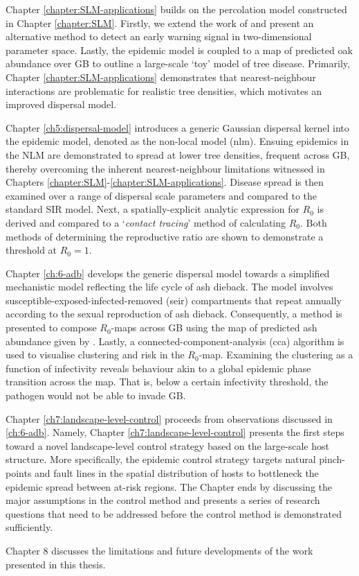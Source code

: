 Chapter \ref{chapter:SLM-applications} builds on the percolation model constructed in Chapter \ref{chapter:SLM}.
Firstly, we extend the work of \cite{OROZCOFUENTES201912} and present an alternative method to detect an early
warning signal in two-dimensional parameter space. Lastly, the epidemic model is coupled to a map of predicted
oak abundance over GB \cite{hill.data} to outline a large-scale `toy' model of tree disease. 
Primarily, Chapter \ref{chapter:SLM-applications} demonstrates that nearest-neighbour interactions are problematic
for realistic tree densities, which motivates an improved dispersal model. 

Chapter \ref{ch5:dispersal-model} introduces a generic Gaussian dispersal kernel into the epidemic model, denoted as the non-local model (\acrshort{nlm}). 
Ensuing epidemics in the NLM are demonstrated to spread at lower tree densities, frequent across GB, thereby overcoming the inherent nearest-neighbour limitations witnessed in Chapters \ref{chapter:SLM}-\ref{chapter:SLM-applications}.
Disease spread is then examined over a range of dispersal scale parameters and compared to the standard SIR model. Next, a spatially-explicit analytic expression for $R_0$ is derived and compared to a `\textit{contact tracing}' method of calculating $R_0$.
Both methods of determining the reproductive ratio are shown to demonstrate a threshold at $R_0=1$.

Chapter \ref{ch:6-adb} develops the generic dispersal model towards a simplified mechanistic
model reflecting the life cycle of ash dieback. The model involves susceptible-exposed-infected-removed (\acrshort{seir}) compartments that repeat annually according to the sexual reproduction of ash dieback. Consequently, a method is presented to compose $R_0$-maps
across GB using the map of predicted ash abundance given by \cite{hill.data}. Lastly, a connected-component-analysis
(\acrshort{cca}) algorithm is used to visualise  clustering and risk in the $R_0$-map. Examining the clustering as a function
of infectivity reveals behaviour akin to a global epidemic phase transition across the map. That is, below a certain infectivity threshold, 
the pathogen would not be able to invade GB.

Chapter \ref{ch7:landscape-level-control} proceeds from observations discussed in \ref{ch:6-adb}. 
Namely, Chapter \ref{ch7:landscape-level-control} presents the first steps toward a novel landscape-level
control strategy based on the large-scale host structure. More specifically, the epidemic control strategy targets
natural pinch-points and fault lines in the spatial distribution of hosts to bottleneck the epidemic
spread between at-risk regions. The Chapter ends by discussing the major assumptions in the control method and presents
a series of research questions that need to be addressed before the control method is demonstrated sufficiently.

Chapter 8 discusses the limitations and future developments of the work presented in this thesis.